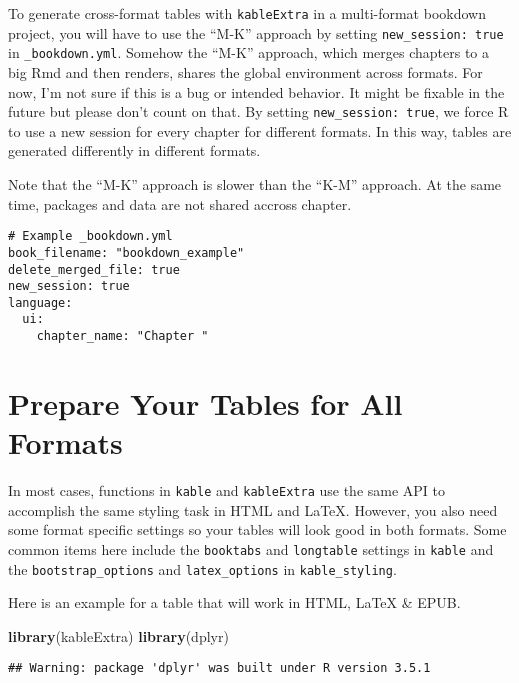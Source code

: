 \documentclass[]{book}
\newenvironment{Shaded}{\begin{snugshade}}{\end{snugshade}}
\newcommand{\KeywordTok}[1]{\textcolor[rgb]{0.13,0.29,0.53}{\textbf{#1}}}
\newcommand{\NormalTok}[1]{#1}
\begin{document}
To generate cross-format tables with \texttt{kableExtra} in a
multi-format bookdown project, you will have to use the ``M-K'' approach
by setting \texttt{new\_session:\ true} in \texttt{\_bookdown.yml}.
Somehow the ``M-K'' approach, which merges chapters to a big Rmd and
then renders, shares the global environment across formats. For now, I'm
not sure if this is a bug or intended behavior. It might be fixable in
the future but please don't count on that. By setting
\texttt{new\_session:\ true}, we force R to use a new session for every
chapter for different formats. In this way, tables are generated
differently in different formats.

Note that the ``M-K'' approach is slower than the ``K-M'' approach. At
the same time, packages and data are not shared accross chapter.

\begin{verbatim}
# Example _bookdown.yml
book_filename: "bookdown_example"
delete_merged_file: true
new_session: true
language:
  ui:
    chapter_name: "Chapter "
\end{verbatim}

\hypertarget{prepare-your-tables-for-all-formats}{%
\section{Prepare Your Tables for All
Formats}\label{prepare-your-tables-for-all-formats}}

In most cases, functions in \texttt{kable} and \texttt{kableExtra} use
the same API to accomplish the same styling task in HTML and LaTeX.
However, you also need some format specific settings so your tables will
look good in both formats. Some common items here include the
\texttt{booktabs} and \texttt{longtable} settings in \texttt{kable} and
the \texttt{bootstrap\_options} and \texttt{latex\_options} in
\texttt{kable\_styling}.

Here is an example for a table that will work in HTML, LaTeX \& EPUB.

\begin{Shaded}
\begin{Highlighting}[]
\KeywordTok{library}\NormalTok{(kableExtra)}
\KeywordTok{library}\NormalTok{(dplyr)}
\end{Highlighting}
\end{Shaded}

\begin{verbatim}
## Warning: package 'dplyr' was built under R version 3.5.1
\end{verbatim}
\end{document}
